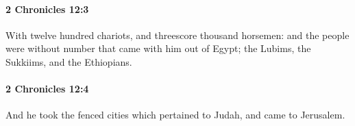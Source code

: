 		\paragraph{2 Chronicles 12:3} %
			\label{2CHRONICLES-12-3}

			With twelve hundred chariots, and threescore thousand horsemen: and the people were without number that came with him out of Egypt; the Lubims, the Sukkiims, and the Ethiopians.


		\paragraph{2 Chronicles 12:4} %
			\label{2CHRONICLES-12-4}

			And he took the fenced cities which pertained to Judah, and came to Jerusalem.


